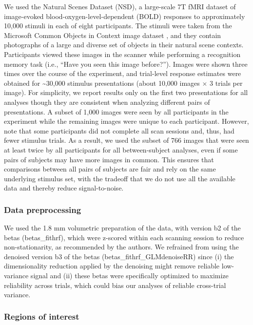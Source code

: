 \documentclass[10pt]{article}
\begin{document}
We used the Natural Scenes Dataset (NSD), a large-scale 7T fMRI dataset of image-evoked blood-oxygen-level-dependent (BOLD) responses to approximately 10,000 stimuli in each of eight participants. The stimuli were taken from the Microsoft Common Objects in Context image dataset \autocite{Lin2014}, and they contain photographs of a large and diverse set of objects in their natural scene contexts. Participants viewed these images in the scanner while performing a recognition memory task (i.e., ``Have you seen this image before?''). Images were shown three times over the course of the experiment, and trial-level response estimates were obtained for \textasciitilde30,000 stimulus presentations (about 10,000 images \(\times\) 3 trials per image). For simplicity, we report results only on the first two presentations for all analyses though they are consistent when analyzing different pairs of presentations. A subset of 1,000 images were seen by all participants in the experiment while the remaining images were unique to each participant. However, note that some participants did not complete all scan sessions and, thus, had fewer stimulus trials. As a result, we used the subset of 766 images that were seen at least twice by all participants for all between-subject analyses, even if some pairs of subjects may have more images in common. This ensures that comparisons between all pairs of subjects are fair and rely on the same underlying stimulus set, with the tradeoff that we do not use all the available data and thereby reduce signal-to-noise.

\subsubsection{Data preprocessing}\label{data-preprocessing}

We used the 1.8 mm volumetric preparation of the data, with version b2 of the betas (betas\_fithrf), which were z-scored within each scanning session to reduce non-stationarity, as recommended by the authors. We refrained from using the denoised version b3 of the betas (betas\_fithrf\_GLMdenoiseRR) since (i) the dimensionality reduction applied by the denoising might remove reliable low-variance signal and (ii) these betas were specifically optimized to maximize reliability across trials, which could bias our analyses of reliable cross-trial variance.

\subsubsection{Regions of interest}\label{regions-of-interest}
\end{document}
